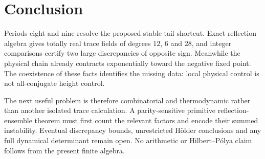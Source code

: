 \section{Conclusion}

Periods eight and nine resolve the proposed stable-tail shortcut.  Exact
reflection algebra gives totally real trace fields of degrees $12$, $6$ and
$28$, and integer comparisons certify two large discrepancies of opposite
sign.  Meanwhile the physical chain already contracts exponentially toward
the negative fixed point.  The coexistence of these facts identifies the
missing data: local physical control is not all-conjugate height control.

The next useful problem is therefore combinatorial and thermodynamic rather
than another isolated trace calculation.  A parity-sensitive primitive
reflection-ensemble theorem must first count the relevant factors and encode
their summed instability.  Eventual discrepancy bounds, unrestricted
H\"older conclusions and any full dynamical determinant remain open.  No
arithmetic or Hilbert--P\'olya claim follows from the present finite algebra.

